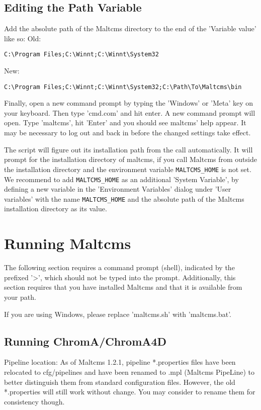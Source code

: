 \subsection{Editing the Path Variable}
Add the absolute path of the Maltcms directory to the end of the 'Variable value' like so:
Old:
\begin{lstlisting}[style=script]
C:\Program Files;C:\Winnt;C:\Winnt\System32
\end{lstlisting}

New:
\begin{lstlisting}[style=script]
C:\Program Files;C:\Winnt;C:\Winnt\System32;C:\Path\To\Maltcms\bin
\end{lstlisting}

Finally, open a new command prompt by typing the 'Windows' or 'Meta' key
on your keyboard. Then type 'cmd.com' and hit enter. A new command prompt
will open. Type 'maltcms', hit 'Enter' and you should see maltcms' help
appear. It may be necessary to log out and back in before the changed 
settings take effect.

The script will figure out its installation path from the call
automatically. It will prompt for the installation directory of 
maltcms, if you call Maltcms from outside the installation directory and
the environment variable \verb|MALTCMS_HOME| is not set. We recommend to add 
\verb|MALTCMS_HOME| as an additional 'System Variable', by defining a new 
variable in the 'Environment Variables' dialog under 'User variables'
with the name \verb|MALTCMS_HOME| and the absolute path of the Maltcms 
installation directory as its value.

\section{Running Maltcms}

The following section requires a command prompt (shell), indicated by
the prefixed '>', which should not be typed into the prompt. Additionally,
this section requires that you have installed Maltcms and that it is 
available from your path.

If you are using Windows, please replace 'maltcms.sh' with 'maltcms.bat'.

\subsection{Running ChromA/ChromA4D}    
Pipeline location: As of Maltcms 1.2.1, pipeline *.properties files
have been relocated to cfg/pipelines and have been renamed to .mpl 
(Maltcms PipeLine) to better distinguish them from standard 
configuration files. However, the old *.properties will still work 
without change. You may consider to rename them for consistency though.

